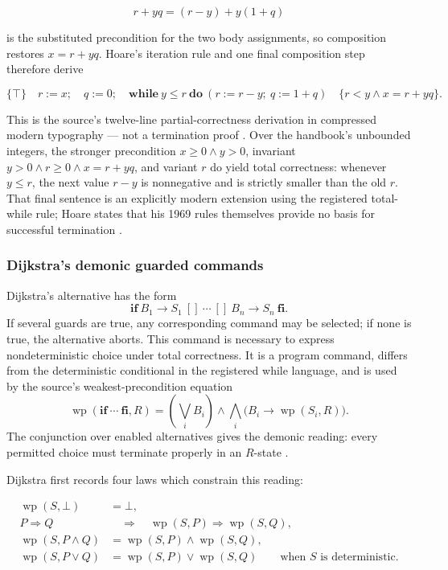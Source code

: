\[
 r+yq=(r-y)+y(1+q)
\]

is the substituted precondition for the two body assignments, so composition
restores \(x=r+yq\).  Hoare's iteration rule and one final composition step
therefore derive

\[
 \{\top\}\quad r:=x;\quad q:=0;\quad
 \mathbf{while}\ y\leq r\ \mathbf{do}\ 
      (r:=r-y;\ q:=1+q)\quad
 \{r<y\land x=r+yq\}.
\]

This is the source's twelve-line partial-correctness derivation in compressed
modern typography — not a termination proof
\cite[pp.~578--579, Table~III]{Hoare1969}.  Over the handbook's unbounded
integers, the stronger precondition \(x\geq0\land y>0\), invariant
\(y>0\land r\geq0\land x=r+yq\), and variant \(r\) do yield total correctness:
whenever \(y\leq r\), the next value \(r-y\) is nonnegative and is strictly
smaller than the old \(r\).  That final sentence is an explicitly modern
extension using the registered total-while rule; Hoare states that his 1969
rules themselves provide no basis for successful termination
\cite[p.~579]{Hoare1969}.

\subsubsection{Dijkstra's demonic guarded commands}

Dijkstra's alternative has the form
\[
 \mathbf{if}\ B_1\to S_1\ []\ \cdots\ []\ B_n\to S_n\ \mathbf{fi}.
\]
If several guards are true, any corresponding command may be selected; if none
is true, the alternative aborts.  This command is necessary to express
nondeterministic choice under total correctness.  It is a program command,
differs from the deterministic conditional in the registered while language,
and is used by the source's weakest-precondition equation
\[
 \operatorname{wp}(\mathbf{if}\ \cdots\ \mathbf{fi},R)
 =\left(\bigvee_i B_i\right)
   \land
   \bigwedge_i\bigl(B_i\to\operatorname{wp}(S_i,R)\bigr).
\]
The conjunction over enabled alternatives gives the demonic reading: every
permitted choice must terminate properly in an \(R\)-state
\cite[\S\S2--3.1]{Dijkstra1975}.

Dijkstra first records four laws which constrain this reading:

\[
\begin{aligned}
 \operatorname{wp}(S,\bot)&=\bot,\\
 P\Rightarrow Q&\quad\Longrightarrow\quad
   \operatorname{wp}(S,P)\Rightarrow\operatorname{wp}(S,Q),\\
 \operatorname{wp}(S,P\land Q)
   &=\operatorname{wp}(S,P)\land\operatorname{wp}(S,Q),\\
 \operatorname{wp}(S,P\lor Q)
   &=\operatorname{wp}(S,P)\lor\operatorname{wp}(S,Q)
   \qquad\text{when \(S\) is deterministic.}
\end{aligned}
\]

